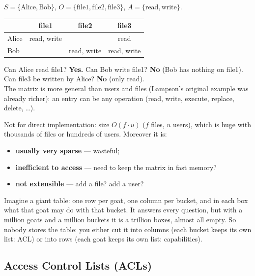 \begin{exbox}[title=Access control matrix]
$S = \{\text{Alice}, \text{Bob}\}$, $O = \{\text{file1}, \text{file2},
\text{file3}\}$, $A = \{\text{read}, \text{write}\}$.
\begin{center}
\begin{tabular}{l|c|c|c}
      & file1      & file2      & file3      \\ \hline
Alice & read, write &            & read       \\
Bob   &            & read, write & read, write
\end{tabular}
\end{center}
Can Alice read file1? \textbf{Yes.} Can Bob write file1? \textbf{No} (Bob has nothing on
file1). Can file3 be written by Alice? \textbf{No} (only read). \\
The matrix is more general than users and files (Lampson's original example was already richer):
an entry can be any operation (read, write, execute, replace, delete, \ldots).
\end{exbox}

\begin{warnbox}[title=The matrix is an abstract concept]
Not for direct implementation: size $O(f \cdot u)$ ($f$ files, $u$ users), which is huge
with thousands of files or hundreds of users. Moreover it is:
\begin{itemize}
  \item \textbf{usually very sparse} --- wasteful;
  \item \textbf{inefficient to access} --- need to keep the matrix in fast memory?
  \item \textbf{not extensible} --- add a file? add a user?
\end{itemize}
\end{warnbox}

\begin{goatbox}
Imagine a giant table: one row per goat, one column per bucket, and in each box what that goat
may do with that bucket. It answers every question, but with a million goats and a million
buckets it is a trillion boxes, almost all empty. So nobody stores the table: you either cut it
into columns (each bucket keeps its own list: ACL) or into rows (each goat keeps its own list:
capabilities).
\end{goatbox}

\subsection{Access Control Lists (ACLs)}

